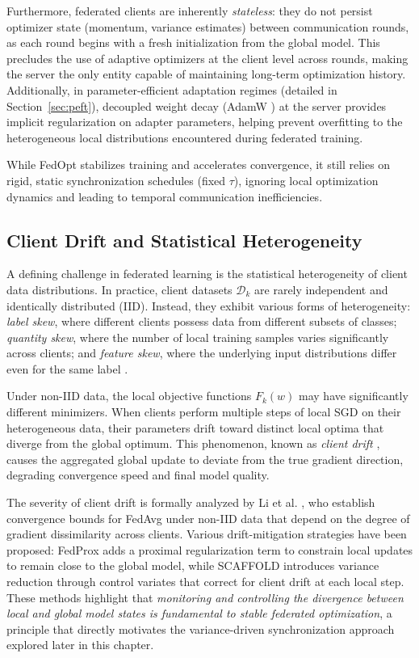 Furthermore, federated clients are inherently \emph{stateless}: they do not persist optimizer state (momentum, variance estimates) between communication rounds, as each round begins with a fresh initialization from the global model. This precludes the use of adaptive optimizers at the client level across rounds, making the server the only entity capable of maintaining long-term optimization history. Additionally, in parameter-efficient adaptation regimes (detailed in Section~\ref{sec:peft}), decoupled weight decay (AdamW \cite{loshchilov2019decoupled}) at the server provides implicit regularization on adapter parameters, helping prevent overfitting to the heterogeneous local distributions encountered during federated training.

While FedOpt stabilizes training and accelerates convergence, it still relies on rigid, static synchronization schedules (fixed $\tau$), ignoring local optimization dynamics and leading to temporal communication inefficiencies.

\subsection{Client Drift and Statistical Heterogeneity}
\label{sec:client_drift}
A defining challenge in federated learning is the statistical heterogeneity of client data distributions. In practice, client datasets $\mathcal{D}_k$ are rarely independent and identically distributed (IID). Instead, they exhibit various forms of heterogeneity: \emph{label skew}, where different clients possess data from different subsets of classes; \emph{quantity skew}, where the number of local training samples varies significantly across clients; and \emph{feature skew}, where the underlying input distributions differ even for the same label \cite{zhu2021federated}.

Under non-IID data, the local objective functions $F_k(w)$ may have significantly different minimizers. When clients perform multiple steps of local SGD on their heterogeneous data, their parameters drift toward distinct local optima that diverge from the global optimum. This phenomenon, known as \emph{client drift} \cite{karimireddy2020scaffold}, causes the aggregated global update to deviate from the true gradient direction, degrading convergence speed and final model quality.

The severity of client drift is formally analyzed by Li et al. \cite{li2020convergence}, who establish convergence bounds for FedAvg under non-IID data that depend on the degree of gradient dissimilarity across clients. Various drift-mitigation strategies have been proposed: FedProx \cite{li2020federated} adds a proximal regularization term to constrain local updates to remain close to the global model, while SCAFFOLD \cite{karimireddy2020scaffold} introduces variance reduction through control variates that correct for client drift at each local step. These methods highlight that \emph{monitoring and controlling the divergence between local and global model states is fundamental to stable federated optimization}, a principle that directly motivates the variance-driven synchronization approach explored later in this chapter.

